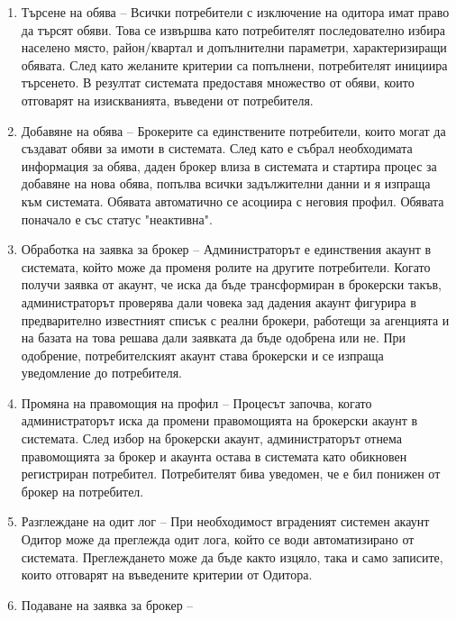 \documentclass[a4paper]{article}
\begin{document}
\begin{enumerate}
\renewcommand{\theenumi}{A-\arabic{enumi}}
\item {Търсене на обява --
    Всички потребители с изключение на одитора имат право да търсят обяви. Това
    се извършва като потребителят последователно избира населено място,
    район/квартал и допълнителни параметри, характеризиращи обявата. След като желаните 
    критерии са попълнени, потребителят инициира търсенето. В резултат системата
    предоставя множество от обяви, които отговарят на изискванията, въведени от
    потребителя.
}
\item {Добавяне на обява --
        Брокерите са единствените потребители, които могат да създават обяви за имоти
        в системата. След като е събрал необходимата информация за обява, даден брокер
        влиза в системата и стартира процес за добавяне на нова обява, попълва всички
        задължителни данни и я изпраща към системата. Обявата автоматично се асоциира с
        неговия профил. Обявата поначало е със статус "неактивна".
}
\item {Обработка на заявка за брокер -- 
        Администраторът е единствения акаунт в системата, който може да променя ролите
        на другите потребители. Когато получи заявка от акаунт, че иска да бъде трансформиран в брокерски такъв, администраторът проверява дали човека зад дадения
        акаунт фигурира в предварително известният списък с реални брокери, работещи за
        агенцията и на базата на това решава дали заявката да бъде одобрена или не. При 
        одобрение, потребителският акаунт става брокерски и се изпраща уведомление до 
        потребителя.
}
\item {Промяна на правомощия на профил -- 
        Процесът започва, когато администраторът иска да промени правомощията на брокерски
        акаунт в системата. След избор на брокерски акаунт, администраторът отнема правомощията за брокер и акаунта остава в системата като обикновен регистриран потребител. Потребителят бива уведомен, че е бил понижен от брокер на потребител.
}
\item {Разглеждане на одит лог --
        При необходимост вграденият системен акаунт Одитор може да преглежда одит лога,
        който се води автоматизирано от системата. Преглеждането може да бъде както изцяло,
        така и само записите, които отговарят на въведените критерии от Одитора.
}
\item {Подаване на заявка за брокер -- 
}
\end{enumerate}
\end{document}
